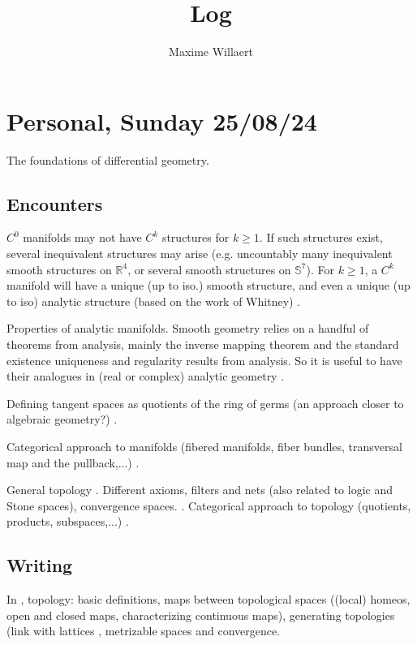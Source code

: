 \documentclass[a4paper,12pt,parskip=half*,chapterprefix=true,numbers=noendperiod]{scrreprt}
\title{Log}
\author{Maxime Willaert}
\theoremstyle{definition}
\theoremstyle{remark}
\begin{document}
\maketitle

\tableofcontents

\section{Personal, Sunday 25/08/24}

The foundations of differential geometry.

\subsection{Encounters}

$C^0$ manifolds may not have $C^k$ structures for $k\geq 1$. If such structures exist, several inequivalent structures may arise (e.g. uncountably many inequivalent smooth structures on $\mathbb{R}^4$, or several smooth structures on $\mathbb{S}^7$). For $k\geq 1$, a $C^k$ manifold will have a unique (up to iso.) smooth structure, and even a unique (up to iso) analytic structure (based on the work of Whitney) \cite{Overflow:ManifoldAnalyticStructure,Stack:WhitneyAnalyticEmbedding}.

Properties of analytic manifolds. Smooth geometry relies on a handful of theorems from analysis, mainly the inverse mapping theorem and the standard existence uniqueness and regularity results from analysis. So it is useful to have their analogues in (real or complex) analytic geometry \cite{Narasimhan:AnalysisRealComplexMan,Bourbaki:VarietesDiffAnalytic}.

Defining tangent spaces as quotients of the ring of germs (an approach closer to algebraic geometry?) \cite{Warner:DiffMan}.

Categorical approach to manifolds (fibered manifolds, fiber bundles, transversal map and the pullback,...) \cite{KMS:NatDiffGeo}.

General topology \cite{Munkres:Top}. Different axioms, filters and nets (also related to logic and Stone spaces), convergence spaces. \cite{Wiki:AxiomTop,Wiki:FiltersTop,Wiki:ConvergenceSpace}. Categorical approach to topology (quotients, products, subspaces,...) \cite{Lee:IntTopMan}.

\subsection{Writing}

In \cite{personal:BasicsDiffGeo}, topology: basic definitions, maps between topological spaces ((local) homeos, open and closed maps, characterizing continuous maps), generating topologies (link with lattices \cite{personal:Lattices}, metrizable spaces and convergence.





\printbibliography
\end{document}
